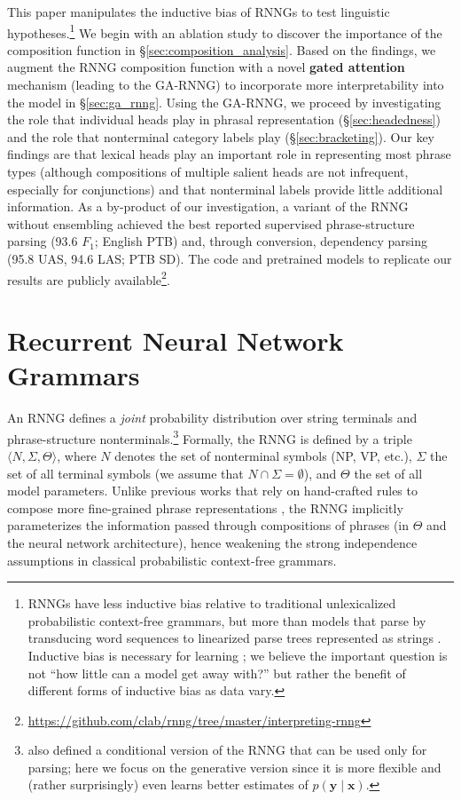 \documentclass[11pt]{article}
\begin{document}
This paper manipulates the inductive bias of RNNGs to test linguistic hypotheses.\footnote{RNNGs have less inductive bias relative to traditional unlexicalized probabilistic context-free grammars, but more than models that parse by transducing word sequences to linearized parse trees represented as strings \cite{vinyals:2015}.  Inductive bias is necessary for learning \cite{mitchell-80}; we believe the important question is not ``how little can a model get away with?'' but rather the benefit of different forms of inductive bias as data vary.}
We begin with an ablation study to discover the importance of the composition function in \S\ref{sec:composition_analysis}. Based on the findings, we augment the RNNG composition function with a novel \textbf{gated attention} mechanism (leading to the GA-RNNG) to incorporate more interpretability into the model in \S\ref{sec:ga_rnng}. Using the GA-RNNG, we proceed by investigating the role that individual heads play in phrasal representation (\S\ref{sec:headedness}) and the role that nonterminal category labels play (\S\ref{sec:bracketing}). Our key findings are that lexical heads play an important role in representing most phrase types (although compositions of multiple salient heads are not infrequent, especially for conjunctions) and that nonterminal labels provide little additional information. As a by-product of our investigation, a variant of the RNNG without ensembling achieved the best reported supervised phrase-structure parsing (93.6 $F_1$; English PTB) and, through conversion, dependency parsing (95.8 UAS, 94.6 LAS; PTB SD). The code and pretrained models to replicate our results are publicly available\footnote{\url{https://github.com/clab/rnng/tree/master/interpreting-rnng}}.


\section{Recurrent Neural Network Grammars}\label{sec:rnng}

An RNNG defines a \emph{joint} probability distribution over string terminals and phrase-structure nonterminals.\footnote{ also defined a conditional version of the RNNG that can be used only for parsing; here we focus on the generative version since it is more flexible and (rather surprisingly) even learns better estimates of $p(\boldsymbol{y} \mid \boldsymbol{x})$.} Formally, the RNNG is defined by a triple $\langle N,\Sigma,\Theta \rangle$, where $N$ denotes the set of nonterminal symbols (NP, VP, etc.), $\Sigma$ the set of all terminal symbols (we assume that $N \cap \Sigma = \emptyset$), and $\Theta$ the set of all model parameters. Unlike previous works that rely on hand-crafted rules to compose more fine-grained phrase representations \cite{collins_97,klein_03}, the RNNG implicitly parameterizes the information passed through compositions of phrases (in $\Theta$ and the neural network architecture), hence weakening the strong independence assumptions in classical probabilistic context-free grammars. 
\end{document}

